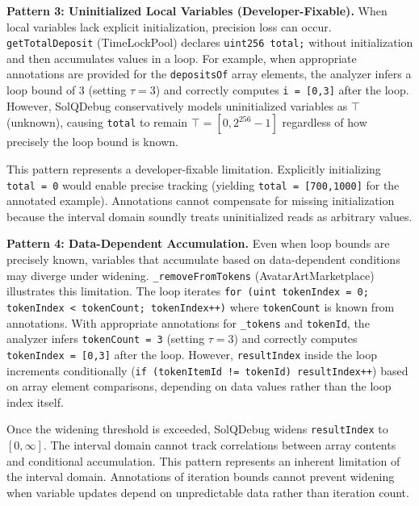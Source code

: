 \documentclass[pdflatex,sn-basic]{sn-jnl}%
\theoremstyle{thmstyleone}%
\theoremstyle{thmstyletwo}%
\theoremstyle{thmstylethree}%
\begin{document}
\smallskip
\noindent\textbf{Pattern 3: Uninitialized Local Variables (Developer-Fixable).}
When local variables lack explicit initialization, precision loss can occur.
\texttt{getTotalDeposit} (TimeLockPool) declares \texttt{uint256 total;} without initialization
and then accumulates values in a loop.
For example, when appropriate annotations are provided for the \texttt{depositsOf} array elements, the analyzer infers a loop bound of 3 (setting $\tau = 3$) and correctly computes \texttt{i = [0,3]} after the loop.
However, SolQDebug conservatively models uninitialized variables as $\top$ (unknown), causing \texttt{total} to remain $\top = [0, 2^{256}-1]$ regardless of how precisely the loop bound is known.

This pattern represents a developer-fixable limitation.
Explicitly initializing \texttt{total = 0} would enable precise tracking (yielding \texttt{total = [700,1000]} for the annotated example).
Annotations cannot compensate for missing initialization because the interval domain soundly treats uninitialized reads as arbitrary values.

\smallskip
\noindent\textbf{Pattern 4: Data-Dependent Accumulation.}
Even when loop bounds are precisely known,
variables that accumulate based on data-dependent conditions may diverge under widening.
\texttt{\_removeFromTokens} (AvatarArtMarketplace) illustrates this limitation.
The loop iterates \texttt{for (uint tokenIndex = 0; tokenIndex < tokenCount; tokenIndex++)}
where \texttt{tokenCount} is known from annotations.
With appropriate annotations for \texttt{\_tokens} and \texttt{tokenId}, the analyzer infers \texttt{tokenCount = 3} (setting $\tau = 3$) and correctly computes \texttt{tokenIndex = [0,3]} after the loop.
However, \texttt{resultIndex} inside the loop increments conditionally (\texttt{if (tokenItemId != tokenId) resultIndex++}) based on array element comparisons, depending on data values rather than the loop index itself.

Once the widening threshold is exceeded, SolQDebug widens \texttt{resultIndex} to $[0, \infty]$.
The interval domain cannot track correlations between array contents and conditional accumulation.
This pattern represents an inherent limitation of the interval domain.
Annotations of iteration bounds cannot prevent widening when variable updates depend on unpredictable data rather than iteration count.

\medskip
\noindent{}
\end{document}
